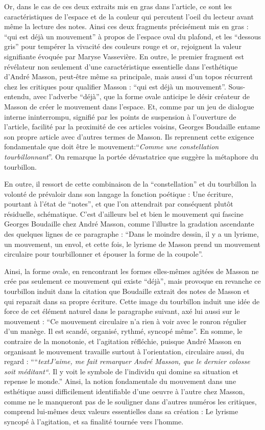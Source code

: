 	 Or, dans le cas de ces deux extraits mis en gras dans l'article, ce sont les caractéristiques de l’espace et de la couleur qui percutent l’oeil du lecteur avant même la lecture des notes. Ainsi ces deux fragments précisément mis en gras : \enquote{qui est déjà un mouvement} à propos de l’espace oval du plafond, et  les \enquote{dessous gris} pour tempérer la vivacité des couleurs rouge et or, rejoignent la valeur signifiante évoquée par Maryse Vassevière. En outre, le premier fragment est révélateur non seulement d’une caractéristique essentielle dans l’esthétique d’André Masson, peut-être même sa principale, mais aussi d’un topos récurrent chez les critiques pour qualifier Masson : \enquote{qui est déjà un mouvement}. Sous-entendu, avec l’adverbe \enquote{déjà}, que la forme ovale anticipe le désir créateur de Masson de créer le mouvement dans l’espace. Et, comme par un jeu de dialogue interne ininterrompu, signifié par les points de suspension à l’ouverture de l’article, facilité par la proximité de ces articles voisins, Georges Boudaille entame son propre article avec d’autres termes de Masson. Ils reprennent cette exigence fondamentale que doit être le mouvement:\enquote{\emph{Comme une constellation tourbillonnant}}.  On remarque la portée dévastatrice que suggère la métaphore du tourbillon. 

	En outre, il  ressort de cette combinaison de la \enquote{constellation} et du tourbillon la volonté de prévaloir dans son langage la fonction poétique : Une écriture, pourtant à l’état de \enquote{notes}, et que l’on attendrait par conséquent plutôt résiduelle, schématique. C’est d’ailleurs bel et bien le mouvement qui fascine Georges Boudaille chez André Masson, comme l’illustre la gradation ascendante des quelques lignes de ce paragraphe : \enquote{Dans le moindre dessin, il y a un lyrisme, un mouvement, un envol, et cette fois, le lyrisme de Masson prend un mouvement circulaire pour tourbillonner et épouser la forme de la coupole}. 

	Ainsi, la forme ovale, en rencontrant les formes elles-mêmes agitées de Masson ne crée pas seulement ce mouvement qui existe \enquote{déjà}, mais provoque en revanche ce tourbillon induit dans la citation que Boudaille extrait des notes de Masson et qui reparait dans sa propre écriture. Cette image du tourbillon induit une idée de force de cet élément naturel dans le paragraphe suivant, axé lui aussi sur le mouvement : \enquote{Ce mouvement circulaire n’a rien à voir avec le ronron régulier d’un manège. Il est scandé, organisé, rythmé, syncopé même}. En somme, le contraire de la monotonie, et l’agitation réfléchie, puisque André Masson en organisant le mouvement travaille surtout à l’orientation, circulaire aussi, du regard : \enquote{“\emph{textJ’aime, me fait remarquer André Masson, que le dernier colosse soit méditant“}. Il y voit le symbole de l’individu qui domine sa situation et repense le monde.} Ainsi, la notion fondamentale du mouvement dans une esthétique aussi difficilement identifiable d’une oeuvre à l’autre chez Masson, comme ne le manqueront pas de le souligner dans d’autres numéros les critiques, comprend lui-mêmes deux valeurs essentielles dans sa création : Le lyrisme syncopé à l’agitation, et sa finalité tournée vers l’homme. 

